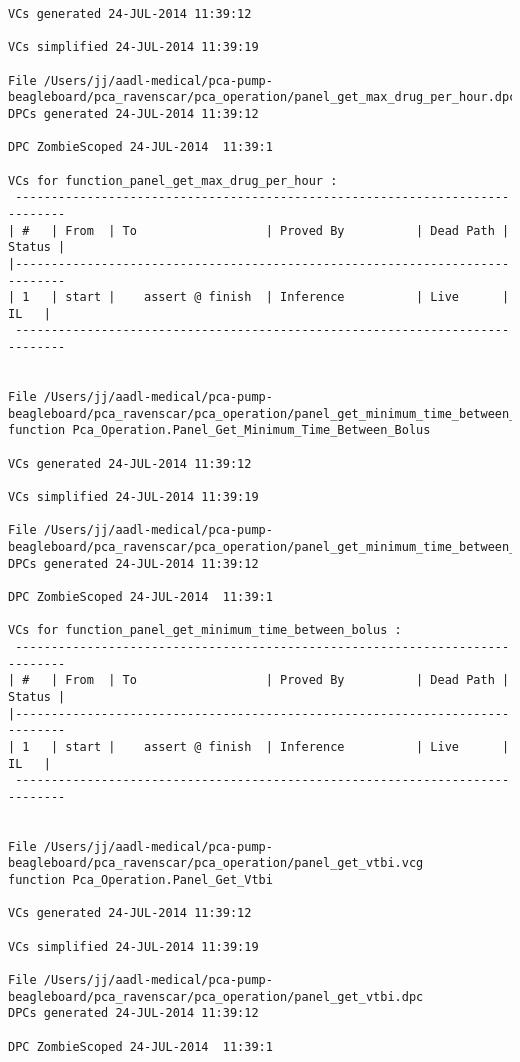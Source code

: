 \begin{lstlisting}[frame=single, gobble=0, caption={POGS report for PCA Pump prototype}]
VCs generated 24-JUL-2014 11:39:12

VCs simplified 24-JUL-2014 11:39:19

File /Users/jj/aadl-medical/pca-pump-beagleboard/pca_ravenscar/pca_operation/panel_get_max_drug_per_hour.dpc
DPCs generated 24-JUL-2014 11:39:12

DPC ZombieScoped 24-JUL-2014  11:39:1

VCs for function_panel_get_max_drug_per_hour :
 -----------------------------------------------------------------------------
| #   | From  | To                  | Proved By          | Dead Path | Status |
|-----------------------------------------------------------------------------
| 1   | start |    assert @ finish  | Inference          | Live      |   IL   |
 -----------------------------------------------------------------------------


File /Users/jj/aadl-medical/pca-pump-beagleboard/pca_ravenscar/pca_operation/panel_get_minimum_time_between_bolus.vcg
function Pca_Operation.Panel_Get_Minimum_Time_Between_Bolus

VCs generated 24-JUL-2014 11:39:12

VCs simplified 24-JUL-2014 11:39:19

File /Users/jj/aadl-medical/pca-pump-beagleboard/pca_ravenscar/pca_operation/panel_get_minimum_time_between_bolus.dpc
DPCs generated 24-JUL-2014 11:39:12

DPC ZombieScoped 24-JUL-2014  11:39:1

VCs for function_panel_get_minimum_time_between_bolus :
 -----------------------------------------------------------------------------
| #   | From  | To                  | Proved By          | Dead Path | Status |
|-----------------------------------------------------------------------------
| 1   | start |    assert @ finish  | Inference          | Live      |   IL   |
 -----------------------------------------------------------------------------


File /Users/jj/aadl-medical/pca-pump-beagleboard/pca_ravenscar/pca_operation/panel_get_vtbi.vcg
function Pca_Operation.Panel_Get_Vtbi

VCs generated 24-JUL-2014 11:39:12

VCs simplified 24-JUL-2014 11:39:19

File /Users/jj/aadl-medical/pca-pump-beagleboard/pca_ravenscar/pca_operation/panel_get_vtbi.dpc
DPCs generated 24-JUL-2014 11:39:12

DPC ZombieScoped 24-JUL-2014  11:39:1


\end{lstlisting}
